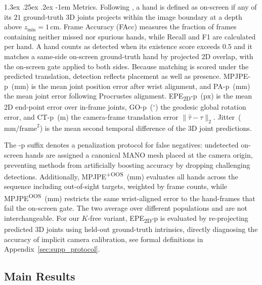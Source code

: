 \documentclass[10pt,twocolumn,letterpaper]{article}
\makeatletter
\renewcommand\paragraph{\@startsection{paragraph}{4}{\z@}%
  {1.3ex \@plus .25ex \@minus .2ex}%
  {-1em}%
  {\normalfont\normalsize\bfseries}}
\makeatother
\begin{document}
\paragraph{Metrics.}
Following \citet{vidihand2026}, a hand is defined as on-screen if any of its $21$ ground-truth 3D joints projects within the image boundary at a depth above $z_{\min}=1$\,cm. Frame Accuracy (FAcc) measures the fraction of frames containing neither missed nor spurious hands, while Recall and F1 are calculated per hand. A hand counts as detected when its existence score exceeds $0.5$ and it matches a same-side on-screen ground-truth hand by projected 2D overlap, with the on-screen gate applied to both sides. Because matching is scored under the predicted translation, detection reflects placement as well as presence. MPJPE-p~($\mathrm{mm}$) is the mean joint position error after wrist alignment, and PA-p~($\mathrm{mm}$) the mean joint error following Procrustes alignment. EPE\textsubscript{2D}-p~($\mathrm{px}$) is the mean 2D end-point error over in-frame joints, GO-p~($^{\circ}$) the geodesic global rotation error, and CT-p~($\mathrm{m}$) the camera-frame translation error $\lVert\hat\tau-\tau\rVert_2$. Jitter~($\mathrm{mm}/\mathrm{frame}^2$) is the mean second temporal difference of the 3D joint predictions.

The \mbox{-p} suffix denotes a penalization protocol for false negatives: undetected on-screen hands are assigned a canonical MANO mesh placed at the camera origin, preventing methods from artificially boosting accuracy by dropping challenging detections. Additionally, MPJPE\textsuperscript{+OOS}~($\mathrm{mm}$) evaluates all hands across the sequence including out-of-sight targets, weighted by frame counts, while MPJPE\textsuperscript{OOS}~($\mathrm{mm}$) restricts the same wrist-aligned error to the hand-frames that fail the on-screen gate. The two average over different populations and are not interchangeable. For our $K$-free variant, EPE\textsubscript{2D}-p is evaluated by re-projecting predicted 3D joints using held-out ground-truth intrinsics, directly diagnosing the accuracy of implicit camera calibration, see formal definitions in Appendix~\ref{sec:supp_protocol}.

\subsection{Main Results}
\label{sec:comp}
\end{document}
